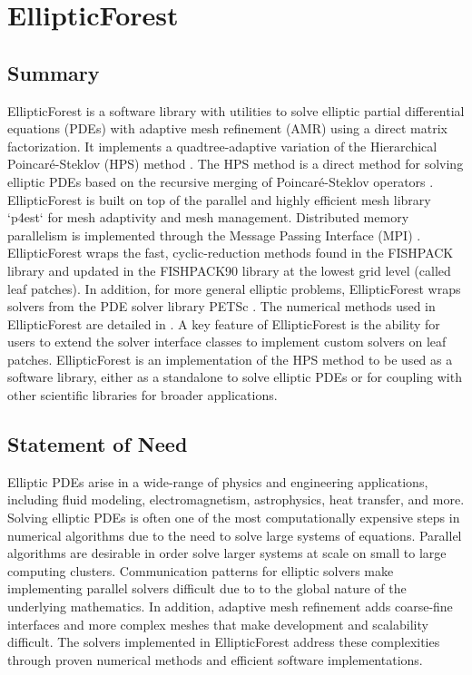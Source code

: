 \section{EllipticForest}


\subsection{Summary}

EllipticForest is a software library with utilities to solve elliptic partial differential equations (PDEs) with adaptive mesh refinement (AMR) using a direct matrix factorization. It implements a quadtree-adaptive variation of the Hierarchical Poincaré-Steklov (HPS) method \cite{gillman2014direct}. The HPS method is a direct method for solving elliptic PDEs based on the recursive merging of Poincaré-Steklov operators \cite{quarteroni1991theory}. EllipticForest is built on top of the parallel and highly efficient mesh library `p4est` \cite{burstedde2011p4est} for mesh adaptivity and mesh management. Distributed memory parallelism is implemented through the Message Passing Interface (MPI) \cite{mpi41}. EllipticForest wraps the fast, cyclic-reduction methods found in the FISHPACK \cite{swarztrauber1999fishpack} library and updated in the FISHPACK90 \cite{adams2016fishpack90} library at the lowest grid level (called leaf patches). In addition, for more general elliptic problems, EllipticForest wraps solvers from the PDE solver library PETSc \cite{anl2023petsc}. The numerical methods used in EllipticForest are detailed in \cite{chipman2024fast}. A key feature of EllipticForest is the ability for users to extend the solver interface classes to implement custom solvers on leaf patches. EllipticForest is an implementation of the HPS method to be used as a software library, either as a standalone to solve elliptic PDEs or for coupling with other scientific libraries for broader applications.

\subsection{Statement of Need}

Elliptic PDEs arise in a wide-range of physics and engineering applications, including fluid modeling, electromagnetism, astrophysics, heat transfer, and more. Solving elliptic PDEs is often one of the most computationally expensive steps in numerical algorithms due to the need to solve large systems of equations. Parallel algorithms are desirable in order solve larger systems at scale on small to large computing clusters. Communication patterns for elliptic solvers make implementing parallel solvers difficult due to to the global nature of the underlying mathematics. In addition, adaptive mesh refinement adds coarse-fine interfaces and more complex meshes that make development and scalability difficult. The solvers implemented in EllipticForest address these complexities through proven numerical methods and efficient software implementations.

